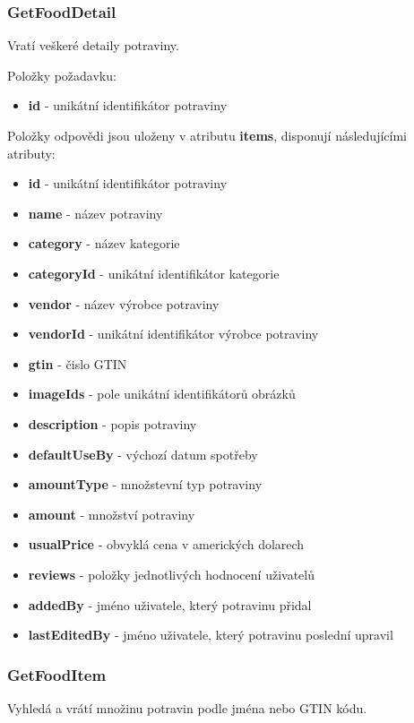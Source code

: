 \documentclass[thesis=B,czech]{FITthesis}[2013/10/20]
\begin{document}
\subsubsection{GetFoodDetail}
Vratí veškeré detaily potraviny.

Položky požadavku:
\begin{itemize}
  \item \textbf{id} - unikátní identifikátor potraviny
\end{itemize}

Položky odpovědi jsou uloženy v atributu \textbf{items}, disponují následujícími atributy:
\begin{itemize}
  \item \textbf{id} - unikátní identifikátor potraviny
  \item \textbf{name} - název potraviny
  \item \textbf{category} - název kategorie
  \item \textbf{categoryId} - unikátní identifikátor kategorie
  \item \textbf{vendor} - název výrobce potraviny
  \item \textbf{vendorId} - unikátní identifikátor výrobce potraviny
  \item \textbf{gtin} - čislo GTIN
  \item \textbf{imageIds} - pole unikátní identifikátorů obrázků
  \item \textbf{description} - popis potraviny
  \item \textbf{defaultUseBy} - výchozí datum spotřeby
  \item \textbf{amountType} - množstevní typ potraviny
  \item \textbf{amount} - množství potraviny
  \item \textbf{usualPrice} - obvyklá cena v amerických dolarech
  \item \textbf{reviews} - položky jednotlivých hodnocení uživatelů
  \item \textbf{addedBy} - jméno uživatele, který potravinu přidal
  \item \textbf{lastEditedBy} - jméno uživatele, který potravinu poslední upravil
\end{itemize}

\subsubsection{GetFoodItem}
Vyhledá a vrátí množinu potravin podle jména nebo GTIN kódu.
\end{document}
